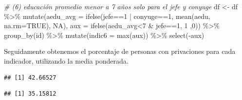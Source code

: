 \documentclass[
]{book}
\newenvironment{Shaded}{\begin{snugshade}}{\end{snugshade}}
\newcommand{\AttributeTok}[1]{\textcolor[rgb]{0.77,0.63,0.00}{#1}}
\newcommand{\CommentTok}[1]{\textcolor[rgb]{0.56,0.35,0.01}{\textit{#1}}}
\newcommand{\ConstantTok}[1]{\textcolor[rgb]{0.00,0.00,0.00}{#1}}
\newcommand{\DecValTok}[1]{\textcolor[rgb]{0.00,0.00,0.81}{#1}}
\newcommand{\FunctionTok}[1]{\textcolor[rgb]{0.00,0.00,0.00}{#1}}
\newcommand{\NormalTok}[1]{#1}
\newcommand{\OtherTok}[1]{\textcolor[rgb]{0.56,0.35,0.01}{#1}}
\newcommand{\SpecialCharTok}[1]{\textcolor[rgb]{0.00,0.00,0.00}{#1}}
\begin{document}
\begin{Shaded}
\begin{Highlighting}[]
\CommentTok{\# (6) educación promedio menor a 7 años solo para el jefe y conyuge}
\NormalTok{df }\OtherTok{\textless{}{-}}\NormalTok{ df }\SpecialCharTok{\%\textgreater{}\%} \FunctionTok{mutate}\NormalTok{(}\AttributeTok{aedu\_avg =} \FunctionTok{ifelse}\NormalTok{(jefe}\SpecialCharTok{==}\DecValTok{1} \SpecialCharTok{|}\NormalTok{ conyuge}\SpecialCharTok{==}\DecValTok{1}\NormalTok{, }\FunctionTok{mean}\NormalTok{(aedu, }\AttributeTok{na.rm=}\ConstantTok{TRUE}\NormalTok{), }\ConstantTok{NA}\NormalTok{),}
                    \AttributeTok{aux =} \FunctionTok{ifelse}\NormalTok{(aedu\_avg}\SpecialCharTok{\textless{}}\DecValTok{7} \SpecialCharTok{\&}\NormalTok{ jefe}\SpecialCharTok{==}\DecValTok{1}\NormalTok{, }\DecValTok{1}\NormalTok{ ,}\DecValTok{0}\NormalTok{)) }\SpecialCharTok{\%\textgreater{}\%} \FunctionTok{group\_by}\NormalTok{(id) }\SpecialCharTok{\%\textgreater{}\%}
             \FunctionTok{mutate}\NormalTok{(}\AttributeTok{indic6 =} \FunctionTok{max}\NormalTok{(aux))  }\SpecialCharTok{\%\textgreater{}\%} \FunctionTok{select}\NormalTok{(}\SpecialCharTok{{-}}\NormalTok{aux)}
\end{Highlighting}
\end{Shaded}

Seguidamente obtenemos el porcentaje de personas con privaciones para cada indicador, utilizando la media ponderada.

\begin{Shaded}
\end{Shaded}

\begin{verbatim}
## [1] 42.66527
\end{verbatim}

\begin{Shaded}
\end{Shaded}

\begin{verbatim}
## [1] 35.15812
\end{verbatim}
\end{document}
